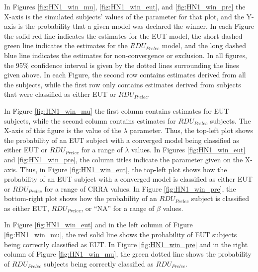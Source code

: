 \documentclass[../main.tex]{subfiles}
\begin{document}
In Figures \ref{fig:HN1_win_mu}, \ref{fig:HN1_win_eut}, and \ref{fig:HN1_win_pre} the X-axis is the simulated subjects' values of the parameter for that plot, and the Y-axis is the probability that a given model was declared the winner.
In each Figure the solid red line indicates the estimates for the EUT model, the short dashed green line indicates the estimates for the $\mathit{RDU_{Prelec}}$ model, and the long dashed blue line indicates the estimates for non-convergence or exclusion.
In all figures, the 95\% confidence interval is given by the dotted lines surrounding the lines given above.
In each Figure, the second row contains estimates derived from all the subjects, while the first row only contains estimates derived from subjects that were classified as either EUT or $\mathit{RDU_{Prelec}}$.

In Figure \ref{fig:HN1_win_mu} the first column contains estimates for EUT subjects, while the second column contains estimates for $\mathit{RDU_{Prelec}}$ subjects.
The X-axis of this figure is the value of the $\lambda$ parameter.
Thus, the top-left plot shows the probability of an EUT subject with a converged model being classified as either EUT or $\mathit{RDU_{Prelec}}$ for a range of $\lambda$ values.
In Figures \ref{fig:HN1_win_eut} and \ref{fig:HN1_win_pre}, the column titles indicate the parameter given on the X-axis.
Thus, in Figure \ref{fig:HN1_win_eut}, the top-left plot shows how the probability of an EUT subject with a converged model is classified as either EUT or $\mathit{RDU_{Prelec}}$ for a range of CRRA values.
In Figure \ref{fig:HN1_win_pre}, the bottom-right plot shows how the probability of an $\mathit{RDU_{Prelec}}$ subject is classified as either EUT, $\mathit{RDU_{Prelec}}$, or \enquote{NA} for a range of $\beta$ values.

In Figure \ref{fig:HN1_win_eut} and in the left column of Figure \ref{fig:HN1_win_mu}, the red solid line shows the probability of EUT subjects being correctly classified as EUT.
In Figure \ref{fig:HN1_win_pre} and in the right column of Figure \ref{fig:HN1_win_mu}, the green dotted line shows the probability of $\mathit{RDU_{Prelec}}$ subjects being correctly classified as $\mathit{RDU_{Prelec}}$.
\end{document}
